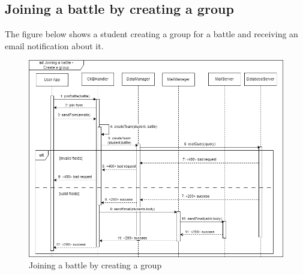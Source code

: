 \subsection{Joining a battle by creating a group}
The figure below shows a student creating a group for a battle and receiving an email notification about it.\\
\begin{figure}[H]
    \centering
    \includegraphics[width=1\textwidth]{images/seq_diagrams/joining_battle_create_group_DD.png}
    \caption{Joining a battle by creating a group}
\end{figure}
\clearpage

